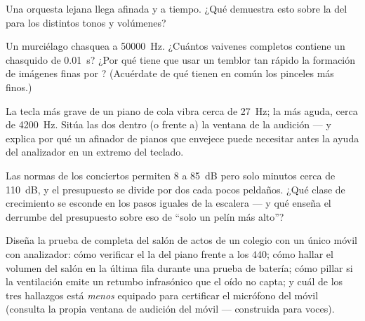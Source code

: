 \begin{exercise}[$\star$]\label{exo:g8:sound-pitch-loudness:8}
Una orquesta lejana llega afinada y a tiempo. ¿Qué demuestra esto sobre
la  del  para los distintos tonos y
volúmenes?
\end{exercise}

\begin{exercise}[$\star\star$]\label{exo:g8:sound-pitch-loudness:9}
Un murciélago chasquea a \qty{50000}{Hz}. ¿Cuántos vaivenes completos
contiene un chasquido de \qty{0.01}{s}? ¿Por qué tiene que usar un
temblor tan rápido la formación de imágenes finas por ?
(Acuérdate de qué tienen en común los pinceles más finos.)
\end{exercise}

\begin{exercise}[$\star\star$]\label{exo:g8:sound-pitch-loudness:10}
La tecla más grave de un piano de cola vibra cerca de \qty{27}{Hz}; la
más aguda, cerca de \qty{4200}{Hz}. Sitúa las dos dentro (o frente a)
la ventana de la audición --- y explica por qué un afinador de
pianos que envejece puede necesitar antes la ayuda del analizador en un
extremo del teclado.
\end{exercise}

\begin{exercise}[$\star\star$]\label{exo:g8:sound-pitch-loudness:11}
Las normas de los conciertos permiten $8$  a \qty{85}{dB}
pero solo minutos cerca de \qty{110}{dB}, y el presupuesto se divide
por dos cada pocos peldaños. ¿Qué clase de crecimiento se esconde en
los pasos iguales de la escalera --- y qué enseña el derrumbe del
presupuesto sobre eso de ``solo un pelín más alto''?
\end{exercise}

\begin{exercise}[$\star\star\star$]\label{exo:g8:sound-pitch-loudness:12}
Diseña la prueba de  completa del salón de actos de un colegio
con un único móvil con analizador: cómo verificar el la del piano
frente a los $440$; cómo hallar el volumen del salón en la última fila
durante una prueba de batería; cómo pillar si la ventilación emite un
retumbo infrasónico que el oído no capta; y cuál de los tres hallazgos
está \emph{menos} equipado para certificar el micrófono del móvil
(consulta la propia ventana de audición del móvil --- construida
para voces).
\end{exercise}

